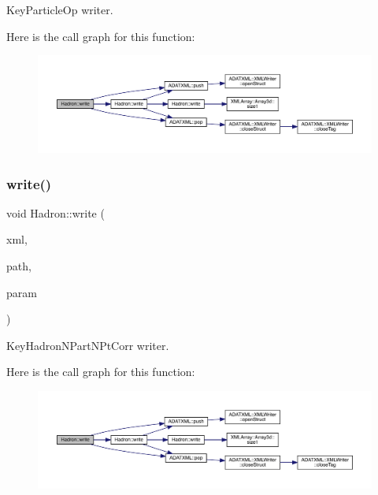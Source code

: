 Key\+Particle\+Op writer. 

Here is the call graph for this function\+:\nopagebreak
\begin{figure}[H]
\begin{center}
\leavevmode
\includegraphics[width=350pt]{d1/daf/namespaceHadron_a1aaa6594011475e4142807cfbf0b78e9_cgraph}
\end{center}
\end{figure}
\mbox{\label{namespaceHadron_a295fddb7420012571f5b8115f2b25a97}} 
\subsubsection{\texorpdfstring{write()}{write()}\hspace{0.1cm}{\footnotesize\ttfamily [30/95]}}
{\footnotesize\ttfamily void Hadron\+::write (\begin{DoxyParamCaption}\item[{\mbox{\hyperlink{classADATXML_1_1XMLWriter}{X\+M\+L\+Writer}} \&}]{xml,  }\item[{const std\+::string \&}]{path,  }\item[{const \mbox{\hyperlink{structHadron_1_1KeyHadronNPartNPtCorr__t}{Key\+Hadron\+N\+Part\+N\+Pt\+Corr\+\_\+t}} \&}]{param }\end{DoxyParamCaption})}



Key\+Hadron\+N\+Part\+N\+Pt\+Corr writer. 

Here is the call graph for this function\+:\nopagebreak
\begin{figure}[H]
\begin{center}
\leavevmode
\includegraphics[width=350pt]{d1/daf/namespaceHadron_a295fddb7420012571f5b8115f2b25a97_cgraph}
\end{center}
\end{figure}
\mbox{\label{namespaceHadron_a67dc2040c75fb33a942bc5a59243c4c3}} 
